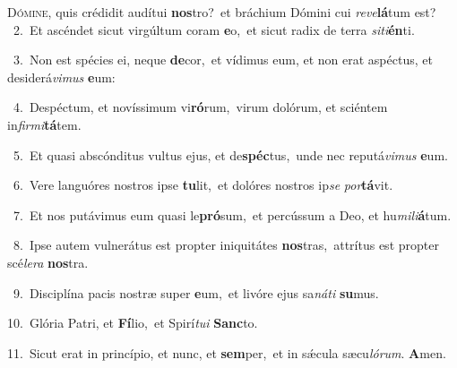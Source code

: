 \lettrine{\initial\textcolor{\initialcolor}{D}}{ómine,} quis crédidit audítui \textbf{nos}\-tro?~\star et bráchium Dómini cui \textit{re}\-\textit{ve}\textbf{lá}tum est?\\
{\numbfont\textcolor{\numbcolor}{~2.}}~Et ascéndet sicut virgúltum coram \textbf{e}\-o,~\star et sicut radix de terra \textit{si}\-\textit{ti}\textbf{én}ti.\par
{\numbfont\textcolor{\numbcolor}{~3.}}~Non est spécies ei, neque \textbf{de}\-cor,~\star et vídimus eum, et non erat aspéctus, et desiderá\-\textit{vi}\-\textit{mus} \textbf{e}\-um:\par
{\numbfont\textcolor{\numbcolor}{~4.}}~Despéctum, et novíssimum vi\-\textbf{ró}\-rum,~\star virum dolórum, et sciéntem in\-\textit{fir}\-\textit{mi}\textbf{tá}tem.\par
{\numbfont\textcolor{\numbcolor}{~5.}}~Et quasi abscónditus vultus ejus, et de\-\textbf{spéc}\-tus,~\star unde nec reputá\-\textit{vi}\-\textit{mus} \textbf{e}\-um.\par
{\numbfont\textcolor{\numbcolor}{~6.}}~Vere languóres nostros ipse \textbf{tu}\-lit,~\star et dolóres nostros ip\textit{se} \textit{por}\-\textbf{tá}vit.\par
{\numbfont\textcolor{\numbcolor}{~7.}}~Et nos putávimus eum quasi le\-\textbf{pró}\-sum,~\star et percússum a Deo, et hu\-\textit{mi}\-\textit{li}\textbf{á}tum.\par
{\numbfont\textcolor{\numbcolor}{~8.}}~Ipse autem vulnerátus est propter iniquitátes \textbf{nos}\-tras,~\star attrítus est propter scé\-\textit{le}\-\textit{ra} \textbf{nos}\-tra.\par
{\numbfont\textcolor{\numbcolor}{~9.}}~Disciplína pacis nostræ super \textbf{e}\-um,~\star et livóre ejus sa\-\textit{ná}\-\textit{ti} \textbf{su}\-mus.\par
{\numbfont\textcolor{\numbcolor}{10.}}~Glória Patri, et \textbf{Fí}\-lio,~\star et Spirí\-\textit{tu}\-\textit{i} \textbf{Sanc}\-to.\par
{\numbfont\textcolor{\numbcolor}{11.}}~Sicut erat in princípio, et nunc, et \textbf{sem}\-per,~\star et in sǽcula sæcu\-\textit{ló}\-\textit{rum}. \textbf{A}\-men.\par
